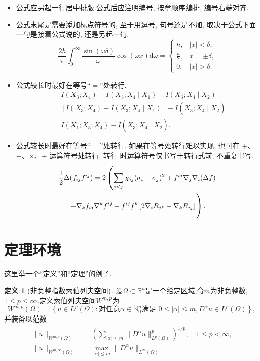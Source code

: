 \documentclass[a4paper,punct=banjiao,twoside]{ctexrep}
\theoremstyle{plain}
\theoremstyle{definition}
\newtheorem{defn}[thm]{定义}
\theoremstyle{remark}
\begin{document}
\begin{itemize}
    \item 公式应另起一行居中排版.公式后应注明编号, 按章顺序编排, 编号右端对齐.
    \item 公式末尾是需要添加标点符号的, 至于用逗号, 句号还是不加, 取决于公式下面一句是接着公式说的, 还是另起一句.
    \begin{equation}
  \frac{2h}{\pi}\int_{0}^{\infty}\frac{\sin\left( \omega\delta \right)}{\omega}
  \cos\left( \omega x \right) \mathrm{d}\omega = 
  \begin{cases}
    h, & \left| x \right| < \delta, \\
    \frac{h}{2}, & x = \pm \delta, \\
    0, & \left| x \right| > \delta.
  \end{cases}
\end{equation}
    \item 公式较长时最好在等号“$=$”处转行.
    \begin{align}
    & I (X_3; X_4) - I (X_3; X_4 \mid X_1) - I (X_3; X_4 \mid X_2) \nonumber \\
  = & [I (X_3; X_4) - I (X_3; X_4 \mid X_1)] - I (X_3; X_4 \mid \tilde{X}_2) \\
  = & I (X_1; X_3; X_4) - I (X_3; X_4 \mid \tilde{X}_2).
\end{align}
\item 公式较长时最好在等号“$=$”处转行.
如果在等号处转行难以实现, 也可在 $+$、$-$、$\times$、$\div$ 运算符号处转行, 转行
时运算符号仅书写于转行式前, 不重复书写.
\begin{multline}
  \frac{1}{2} \Delta (f_{ij} f^{ij}) =
    2 \left(\sum_{i<j} \chi_{ij}(\sigma_{i} - \sigma_{j})^{2}
    + f^{ij} \nabla_{j} \nabla_{i} (\Delta f) \right. \\
  \left. + \nabla_{k} f_{ij} \nabla^{k} f^{ij} +
    f^{ij} f^{k} \left[2\nabla_{i}R_{jk}
    - \nabla_{k} R_{ij} \right] \vphantom{\sum_{i<j}} \right).
\end{multline}
\end{itemize}


\section{定理环境}

这里举一个“定义”和“定理”的例子.

\begin{defn}[非负整指数索伯列夫空间\cite{ChenPDE}]
设$\Omega\subset\mathbb{R}^n$是一个给定区域,令$m$为非负整数,$1\leq p\leq \infty$.定义索伯列夫空间$W^{m,p}$为
$$
W^{m,p}(\Omega)=\left\{u\in L^p(\Omega): \text{对任意}\alpha\in \mathbb{N}_{0}^n\text{满足 }0\leq |\alpha|\leq m, D^{\alpha}u\in L^p(\Omega) \right\},
$$
并装备以范数
\begin{equation*}
\begin{aligned}
\|u\|_{W^{m,p}(\Omega)} &= \left( \sum_{|\alpha|\leq m} \|D^{\alpha}u\|_{L^p(\Omega)}^p \right)^{1/p},\quad 1\leq p <\infty, \label{eq:sobolev-norm}\\
\|u\|_{W^{m,\infty}(\Omega)} &= \max_{|\alpha|\leq m} \|D^{\alpha}u\|_{L^{\infty}(\Omega)}.
\end{aligned}
\end{equation*}
\end{defn}
\end{document}
